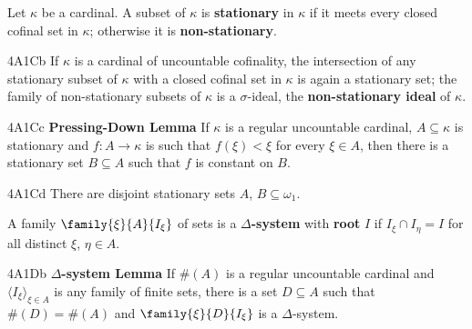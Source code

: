  Let $\kappa$ be a cardinal.   A
subset of $\kappa$ is
{\bf stationary} in $\kappa$ if it meets every closed cofinal set in
$\kappa$;  otherwise it is {\bf non-stationary}.

\spheader 4A1Cb If $\kappa$ is a cardinal of uncountable cofinality,
the intersection of any stationary subset of $\kappa$ with a closed
cofinal
set in $\kappa$ is again a stationary set;  the family of
non-stationary subsets of $\kappa$ is a $\sigma$-ideal, the
{\bf non-stationary ideal} of $\kappa$.

\spheader 4A1Cc {\bf Pressing-Down Lemma} If
$\kappa$ is a regular uncountable cardinal, $A\subseteq\kappa$ is
stationary and $f:A\to\kappa$ is such that $f(\xi)<\xi$ for every
$\xi\in A$, then there is a stationary set $B\subseteq A$ such that
$f$ is constant on $B$.

\spheader 4A1Cd There are disjoint stationary sets $A$,
$B\subseteq\omega_1$.

 A family
$\family{\xi}{A}{I_{\xi}}$
of sets is a {\bf $\Delta$-system} with {\bf root} $I$ if
$I_{\xi}\cap I_{\eta}=I$ for all distinct $\xi$, $\eta\in A$.

\spheader 4A1Db {\bf $\Delta$-system Lemma} If $\#(A)$ is a regular
uncountable cardinal and $\langle I_{\xi}\rangle_{\xi\in A}$ is any
family of finite sets, there is a set $D\subseteq A$ such that
$\#(D)=\#(A)$ and $\family{\xi}{D}{I_{\xi}}$ is a $\Delta$-system.

